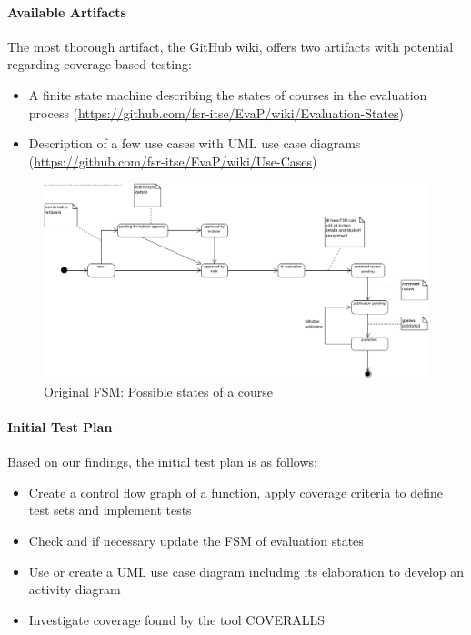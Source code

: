 \paragraph{Available Artifacts}
The most thorough artifact, the GitHub wiki, offers two artifacts with potential regarding coverage-based testing:
\begin{itemize}
    \item A finite state machine describing the states of courses in the evaluation process (\url{https://github.com/fsr-itse/EvaP/wiki/Evaluation-States})
    \item Description of a few use cases with UML use case diagrams (\url{https://github.com/fsr-itse/EvaP/wiki/Use-Cases})
\end{itemize}
\begin{figure}[h]
    \centering
    \includegraphics[width=\textwidth, keepaspectratio]{graphics/original_states_of_a_course}
    \caption{Original FSM: Possible states of a course}
    \label{fig:original-states}
\end{figure}

\paragraph{Initial Test Plan}
Based on our findings, the initial test plan is as follows:
\begin{itemize}
    \item Create a control flow graph of a function, apply coverage criteria to define test sets and implement tests
    \item Check and if necessary update the FSM of evaluation states
    \item Use or create a UML use case diagram including its elaboration to develop an activity diagram
    \item Investigate coverage found by the tool COVERALLS
\end{itemize}

